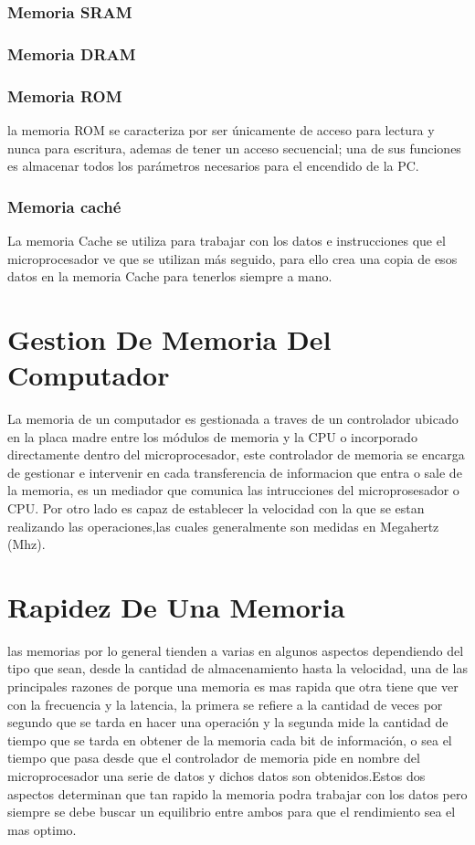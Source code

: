 \documentclass{article}
\begin{document}
\subsubsection{Memoria SRAM}

\subsubsection{Memoria DRAM}

\subsubsection{Memoria ROM}
la memoria ROM  se caracteriza por ser únicamente de acceso para lectura y nunca para escritura, ademas de tener un acceso secuencial; una de sus funciones es almacenar todos los parámetros necesarios para el encendido de la PC.

\subsubsection{Memoria caché}
La memoria Cache se utiliza para trabajar con los datos e instrucciones que el microprocesador ve que se utilizan más seguido, para ello crea una copia de esos datos en la memoria Cache para
tenerlos siempre a mano.


\section{Gestion De Memoria Del Computador}

La memoria de un computador es gestionada a traves de un controlador ubicado en la placa madre entre los módulos de memoria y la CPU o incorporado directamente dentro del microprocesador,  este controlador de memoria se encarga de gestionar e intervenir en  cada transferencia de informacion que entra o sale de la memoria, es un mediador que comunica las intrucciones del microprosesador o CPU. Por otro lado es capaz de establecer la velocidad con la que se estan  realizando las operaciones,las cuales generalmente son medidas en Megahertz (Mhz).
\section{Rapidez De Una Memoria}
las memorias por lo general tienden a varias en algunos aspectos  dependiendo del tipo que sean, desde la cantidad de almacenamiento  hasta la velocidad, una de las principales  razones de porque una memoria es mas rapida que otra tiene que ver con la frecuencia y la latencia, la primera se refiere a la cantidad de veces por segundo que se tarda en hacer una operación  y la segunda  mide la cantidad de tiempo que se tarda en obtener de la memoria cada bit de información, o sea el tiempo que pasa desde que el controlador de memoria pide en nombre del microprocesador una serie de datos y dichos datos son obtenidos.Estos dos aspectos determinan que tan rapido la memoria podra trabajar con los datos pero  siempre se debe buscar un equilibrio entre ambos para que el rendimiento sea el mas optimo. 
\end{document}
